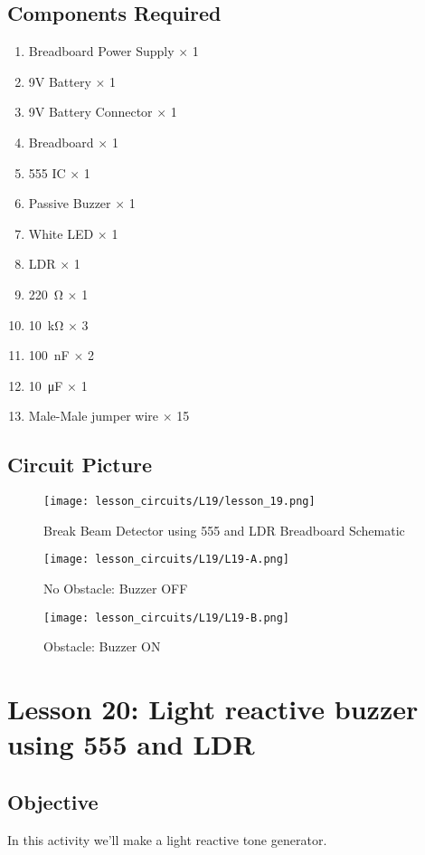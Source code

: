 \subsection{Components Required}
\begin{enumerate}
    \item Breadboard Power Supply $\times$ 1
    \item 9V Battery $\times$ 1
    \item 9V Battery Connector $\times$ 1
    \item Breadboard $\times$ 1
    \item 555 IC $\times$ 1
    \item Passive Buzzer $\times$ 1
    \item White LED $\times$ 1
    \item LDR $\times$ 1
    \item \SI{220}{\ohm} $\times$ 1
    \item \SI{10}{\kilo\ohm} $\times$ 3
    \item \SI{100}{\nano\farad} $\times$ 2
    \item \SI{10}{\micro\farad} $\times$ 1
    \item Male-Male jumper wire $\times$ 15
\end{enumerate}
\subsection{Circuit Picture}
\begin{figure}[!hp]
    \centering
    \texttt{[image: lesson\_circuits/L19/lesson\_19.png]}
    \caption{Break Beam Detector using 555 and LDR Breadboard Schematic}
    \label{fig:555_bbdet_sch}
\end{figure}
\begin{figure}[!hp]
    \centering
    \texttt{[image: lesson\_circuits/L19/L19-A.png]}
    \caption{No Obstacle: Buzzer OFF}
    \label{fig:555_bbdet_obb}
\end{figure}
\begin{figure}[!hp]
    \centering
    \texttt{[image: lesson\_circuits/L19/L19-B.png]}
    \caption{Obstacle: Buzzer ON}
    \label{fig:555_bbdet_obb1}
\end{figure}
\section{Lesson 20: Light reactive buzzer using 555 and LDR}
\subsection{Objective}
In this activity we'll make a light reactive tone generator.
